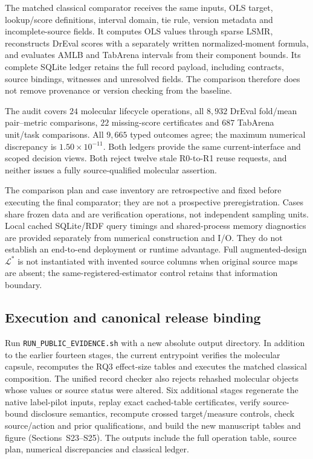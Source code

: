 The matched classical comparator receives the same inputs, OLS target, lookup/score definitions, interval domain, tie rule, version metadata and incomplete-source fields. It computes OLS values through sparse LSMR, reconstructs DrEval scores with a separately written normalized-moment formula, and evaluates AMLB and TabArena intervals from their component bounds. Its complete SQLite ledger retains the full record payload, including contracts, source bindings, witnesses and unresolved fields. The comparison therefore does not remove provenance or version checking from the baseline.

The audit covers $24$ molecular lifecycle operations, all $8{,}932$ DrEval fold/mean pair--metric comparisons, $22$ missing-score certificates and $687$ TabArena unit/task comparisons. All $9{,}665$ typed outcomes agree; the maximum numerical discrepancy is $1.50\times10^{-11}$. Both ledgers provide the same current-interface and scoped decision views. Both reject twelve stale R0-to-R1 reuse requests, and neither issues a fully source-qualified molecular assertion.

The comparison plan and case inventory are retrospective and fixed before executing the final comparator; they are not a prospective preregistration. Cases share frozen data and are verification operations, not independent sampling units. Local cached SQLite/RDF query timings and shared-process memory diagnostics are provided separately from numerical construction and I/O. They do not establish an end-to-end deployment or runtime advantage. Full augmented-design $\mathcal L^*$ is not instantiated with invented source columns when original source maps are absent; the same-registered-estimator control retains that information boundary.

\subsection{Execution and canonical release binding}
Run \nolinkurl{RUN_PUBLIC_EVIDENCE.sh} with a new absolute output directory. In addition to the earlier fourteen stages, the current entrypoint verifies the molecular capsule, recomputes the RQ3 effect-size tables and executes the matched classical composition. The unified record checker also rejects rehashed molecular objects whose values or source status were altered. Six additional stages regenerate the native label-pilot inputs, replay exact cached-table certificates, verify source-bound disclosure semantics, recompute crossed target/measure controls, check source/action and prior qualifications, and build the new manuscript tables and figure (Sections~S23--S25). The outputs include the full operation table, source plan, numerical discrepancies and classical ledger.

